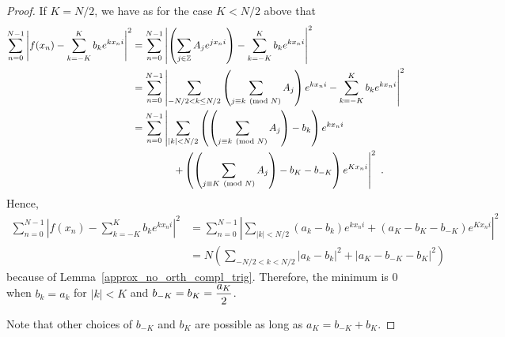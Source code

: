 \begin{proof}
 If $K=N/2$, we have as for the case $K<N/2$ above that
\begin{align*}
\sum_{n=0}^{N-1} \left| f(x_n) - \sum_{k=-K}^K b_k e^{k x_n i} \right|^2
&=\sum_{n=0}^{N-1} \left| \left(\sum_{j\in\mathbb{Z}} A_j e^{j x_n i} \right)
- \sum_{k=-K}^K b_k e^{k x_n i} \right|^2 \\
&=\sum_{n=0}^{N-1} \left| \sum_{-N/2<k\leq N/2}
\left( \sum_{j\equiv k \pmod{N}} A_j \right) e^{k x_n i} - \sum_{k=-K}^K b_k
e^{k x_n i} \right|^2 \\
&= \sum_{n=0}^{N-1} \left| \sum_{|k|<N/2}
\left( \left(\sum_{j\equiv k \pmod{N}} A_j\right) - b_k \right) e^{k x_n i} 
\right. \\
&\qquad \qquad \left.
+ \left(\left(\sum_{j\equiv K \pmod{N}} A_j\right) - b_K - b_{-K}\right)
e^{Kx_n i} \right|^2 \ .
\end{align*}
Hence,
\begin{align*}
\sum_{n=0}^{N-1} \left| f(x_n) - \sum_{k=-K}^K b_k e^{k x_n i} \right|^2 &=
\sum_{n=0}^{N-1} \left| \sum_{|k|<N/2}
\left( a_k - b_k \right) e^{k x_n i} +\left(a_K - b_K - b_{-K}\right)
e^{Kx_n i}\right|^2\\
&= N \left( \sum_{-N/2<k <N/2} \left|a_k - b_k \right|^2 +
\left|a_K - b_{-K}-b_K \right|^2 \right)
\end{align*}
because of Lemma~\ref{approx_no_orth_compl_trig}.
Therefore, the minimum is $0$ when
$b_k=a_k$ for $|k| < K$ and $\displaystyle b_{-K}=b_K = \frac{a_K}{2}$.

Note that other choices of $b_{-K}$ and $b_K$ are possible as long as
$a_K = b_{-K} +b_K$.
\end{proof}

